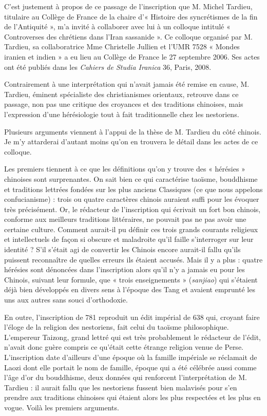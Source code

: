 C'est justement à propos de ce passage de l'inscription que
M. Michel Tardieu, titulaire au Collège de France de la chaire d'«
Histoire des syncrétismes de la fin de l'Antiquité », m'a invité à
collaborer avec lui à un colloque intitulé « Controverses des chrétiens
dans l'Iran sassanide ». Ce colloque organisé par
M. Tardieu, sa collaboratrice Mme Christelle Jullien et l'UMR 7528 «
Mondes iranien et indien » a eu lieu au Collège de France le 27
septembre 2006. Ses actes ont été publiés dans les \emph{Cahiers de
Studia Iranica} 36, Paris, 2008.

Contrairement à une interprétation qui n'avait jamais été remise en
cause, M. Tardieu, éminent spécialiste des christianismes orientaux,
retrouve dans ce passage, non pas une critique des croyances et des
traditions chinoises, mais l'expression d'une hérésiologie tout à fait
traditionnelle chez les nestoriens.

Plusieurs arguments viennent à l'appui de la thèse de
M. Tardieu du côté chinois. Je m'y attarderai d'autant moins qu'on en
trouvera le détail dans les actes de ce colloque.

Les premiers tiennent à ce que les définitions qu'on y trouve des «
hérésies » chinoises sont surprenantes. On sait bien ce qui caractérise
taoïsme, bouddhisme et traditions lettrées fondées sur les plus anciens
Classiques (ce que nous appelons confucianisme) : trois ou quatre
caractères chinois auraient suffi pour les évoquer très précisément. Or,
le rédacteur de l'inscription qui écrivait un fort bon chinois, conforme
aux meilleurs traditions littéraires, ne pouvait pas ne pas avoir une
certaine culture. Comment aurait-il pu définir ces trois grands courants
religieux et intellectuels de façon si obscure et maladroite qu'il
faille s'interroger sur leur identité ? S'il s'était agi de convertir
les Chinois encore aurait-il fallu qu'ils puissent reconnaître de
quelles erreurs ils étaient accusés. Mais il y a plus : quatre hérésies
sont
dénoncées dans l'inscription alors qu'il n'y a jamais eu pour les
Chinois, suivant leur formule, que « trois enseignements »
(\emph{sanjiao}) qui s'étaient déjà bien développés en divers sens à
l'époque des Tang et avaient emprunté les uns aux autres sans souci
d'orthodoxie.

En outre, l'inscription de 781 reproduit un édit impérial de 638 qui,
croyant faire l'éloge de la religion des nestoriens, fait celui du
taoïsme philosophique. L'empereur Taizong, grand lettré qui est très
probablement le rédacteur de l'édit, n'avait donc guère compris ce
qu'était cette étrange religion venue de Perse. L'inscription date
d'ailleurs d'une époque où la famille impériale se réclamait de Laozi
dont elle portait le nom de famille, époque qui a été célébrée aussi
comme l'âge d'or du bouddhisme, deux données qui renforcent
l'interprétation de M. Tardieu : il aurait fallu que les nestoriens
fussent bien malavisés pour s'en prendre aux traditions chinoises qui
étaient alors les plus respectées et les plus en vogue. Voilà les
premiers arguments.

